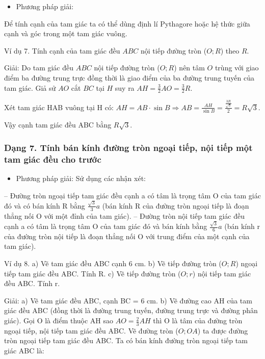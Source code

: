 \documentclass[%
    fontsize=12pt,%
    chapterprefix=false,%
    open=right,%
    twoside=false,%
    numbers=noenddot,%
    headings=optiontohead,%
    final,%
    DIV=15,%
    parskip=half %
]{scrbook}
\begin{document}
\begin{itemize}
  \item Phương pháp giải:
\end{itemize}

Để tính cạnh của tam giác ta có thể dùng định lí Pythagore hoặc hệ thức giữa cạnh và góc trong một tam giác vuông.

Ví dụ 7. Tính cạnh của tam giác đều $ ABC $ nội tiếp đường tròn ($ O; R $) theo $ R $.

Giải: Do tam giác đều $ ABC $ nội tiếp đường tròn ($ O; R $) nên tâm $ O $ trùng với giao điểm ba đường trung trực đồng thời là giao điểm của ba đường trung tuyến của tam giác. Giả sử $ AO $ cắt $ BC $ tại $ H $ suy ra $ AH = \frac{3}{2} AO = \frac{3}{2} R $.


Xét tam giác HAB vuông tại H có: $ AH = AB \cdot \sin B \Rightarrow AB = \frac{AH}{\sin B} = \frac{\frac{3R}{\sqrt{3}}}{2} = R\sqrt{3} $.

Vậy cạnh tam giác đều ABC bằng $ R\sqrt{3} $.
\subsubsection{Dạng 7. Tính bán kính đường tròn ngoại tiếp, nội tiếp một tam giác đều cho trước}

\begin{itemize}
  \item Phương pháp giải: Sử dụng các nhận xét:
\end{itemize}

  -- Đường tròn ngoại tiếp tam giác đều cạnh a có tâm là trọng tâm O của tam giác đó và có bán kính R bằng $ \frac{\sqrt{3}}{3}a $ (bán kính R của đường tròn ngoại tiếp là đoạn thẳng nối O với một đỉnh của tam giác).   -- Đường tròn nội tiếp tam giác đều cạnh a có tâm là trọng tâm O của tam giác đó và bán kính bằng $ \frac{\sqrt{3}}{6}a $ (bán kính r của đường tròn nội tiếp là đoạn thẳng nối O với trung điểm của một cạnh của tam giác).

Ví dụ 8. a) Vẽ tam giác đều ABC cạnh 6 cm.     b) Vẽ tiếp đường tròn ($ O; R $) ngoại tiếp tam giác đều ABC. Tính R.     c) Vẽ tiếp đường tròn ($ O; r $) nội tiếp tam giác đều ABC. Tính r.

Giải: a) Vẽ tam giác đều ABC, cạnh BC = 6 cm. b) Vẽ đường cao AH của tam giác đều ABC (đồng thời là đường trung tuyến, đường trung trực và đường phân giác). Gọi O là điểm thuộc AH sao $ AO = \frac{2}{3}AH $ thì O là tâm của đường tròn ngoại tiếp, nội tiếp tam giác đều ABC. Vẽ đường tròn ($ O; OA $) ta được đường tròn ngoại tiếp tam giác đều ABC. Ta có bán kính đường tròn ngoại tiếp tam giác ABC là:
\end{document}
